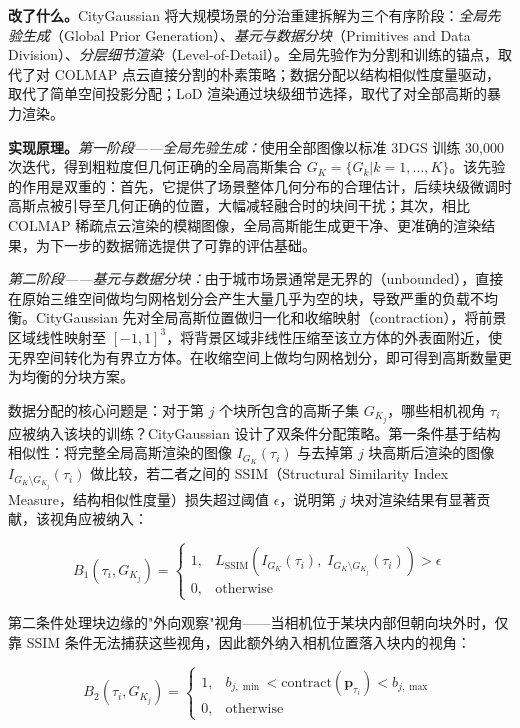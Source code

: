 \textbf{改了什么。}CityGaussian 将大规模场景的分治重建拆解为三个有序阶段：\emph{全局先验生成}（Global Prior Generation）、\emph{基元与数据分块}（Primitives and Data Division）、\emph{分层细节渲染}（Level-of-Detail）。全局先验作为分割和训练的锚点，取代了对 COLMAP 点云直接分割的朴素策略；数据分配以结构相似性度量驱动，取代了简单空间投影分配；LoD 渲染通过块级细节选择，取代了对全部高斯的暴力渲染。

\textbf{实现原理。}\emph{第一阶段——全局先验生成：}使用全部图像以标准 3DGS 训练 30{,}000 次迭代，得到粗粒度但几何正确的全局高斯集合 $G_K = \{G_k | k = 1, \ldots, K\}$。该先验的作用是双重的：首先，它提供了场景整体几何分布的合理估计，后续块级微调时高斯点被引导至几何正确的位置，大幅减轻融合时的块间干扰；其次，相比 COLMAP 稀疏点云渲染的模糊图像，全局高斯能生成更干净、更准确的渲染结果，为下一步的数据筛选提供了可靠的评估基础。

\emph{第二阶段——基元与数据分块：}由于城市场景通常是无界的（unbounded），直接在原始三维空间做均匀网格划分会产生大量几乎为空的块，导致严重的负载不均衡。CityGaussian 先对全局高斯位置做归一化和收缩映射（contraction），将前景区域线性映射至 $[-1, 1]^3$，将背景区域非线性压缩至该立方体的外表面附近，使无界空间转化为有界立方体。在收缩空间上做均匀网格划分，即可得到高斯数量更为均衡的分块方案。

数据分配的核心问题是：对于第 $j$ 个块所包含的高斯子集 $G_{K_j}$，哪些相机视角 $\tau_i$ 应被纳入该块的训练？CityGaussian 设计了双条件分配策略。第一条件基于结构相似性：将完整全局高斯渲染的图像 $I_{G_K}(\tau_i)$ 与去掉第 $j$ 块高斯后渲染的图像 $I_{G_K \setminus G_{K_j}}(\tau_i)$ 做比较，若二者之间的 SSIM（Structural Similarity Index Measure，结构相似性度量）损失超过阈值 $\epsilon$，说明第 $j$ 块对渲染结果有显著贡献，该视角应被纳入：

\begin{equation}
B_1(\tau_i, G_{K_j}) = \begin{cases} 1, & L_{\text{SSIM}}(I_{G_K}(\tau_i),\; I_{G_K \setminus G_{K_j}}(\tau_i)) > \epsilon \\ 0, & \text{otherwise} \end{cases}
\end{equation}

第二条件处理块边缘的"外向观察"视角——当相机位于某块内部但朝向块外时，仅靠 SSIM 条件无法捕获这些视角，因此额外纳入相机位置落入块内的视角：

\begin{equation}
B_2(\tau_i, G_{K_j}) = \begin{cases} 1, & b_{j,\min} < \text{contract}(\mathbf{p}_{\tau_i}) < b_{j,\max} \\ 0, & \text{otherwise} \end{cases}
\end{equation}

